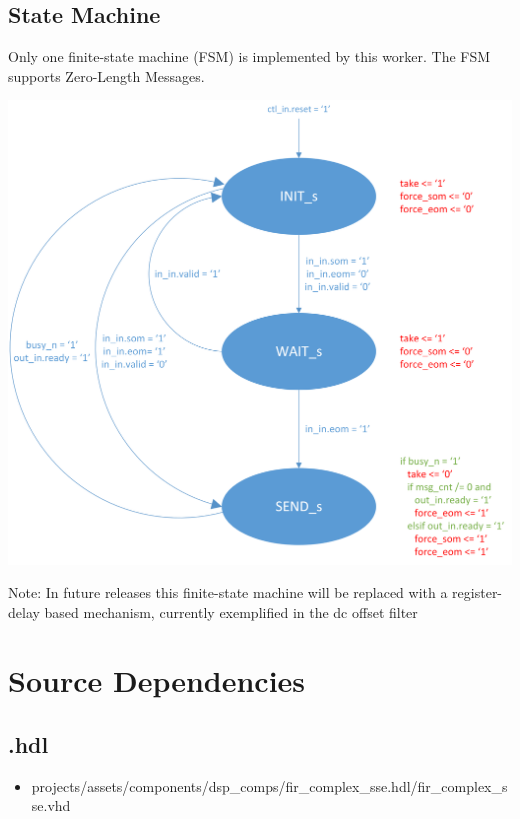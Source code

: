 \subsection*{State Machine}
\begin{flushleft}
	Only one finite-state machine (FSM) is implemented by this worker. The FSM supports Zero-Length Messages.
\end{flushleft}
{\centering\captionsetup{type=figure}\includegraphics[scale=0.7]{zlm_fsm}\par{}\label{fig:zlm_fsm}}
\begin{flushleft}
        Note: In future releases this finite-state machine will be replaced with a register-delay based mechanism, currently exemplified in the dc offset filter
\end{flushleft}

\newpage

\section*{Source Dependencies}
\subsection*{\comp.hdl}
\begin{itemize}
	\item projects/assets/components/dsp\_comps/fir\_complex\_sse.hdl/fir\_complex\_sse.vhd
          
\end{itemize}

